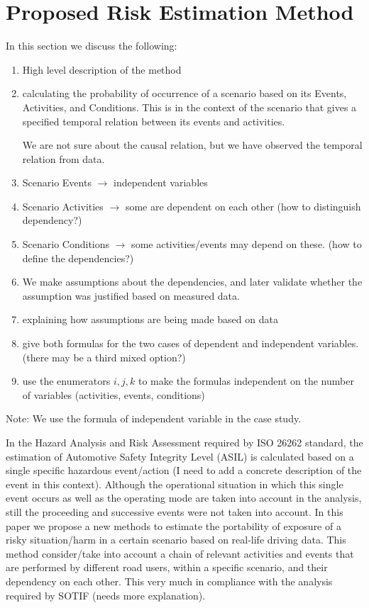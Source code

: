 \section{Proposed Risk Estimation Method} %
\label{sec:method}

In this section we discuss the following:
\begin{enumerate}
	\item High level description of the method 
	\item calculating the probability of occurrence of a scenario based on its Events, Activities, and Conditions. This is in the context of the scenario that gives a specified temporal relation between its events and activities.
	
	We are not sure about the causal relation, but we have observed the temporal relation from data. 
	 
	\item Scenario Events $\rightarrow$ independent variables 
	\item Scenario Activities $\rightarrow$ some are dependent on each other (how to distinguish dependency?)
	\item Scenario Conditions $\rightarrow$ some activities/events may depend on these. (how to define the dependencies?)
	\item We make assumptions about the dependencies, and later validate whether the assumption was justified based on measured data. 	
	\item explaining how assumptions are being made based on data
	\item give both formulas for the two cases of dependent and independent variables. (there may be a third mixed option?)
	\item use the enumerators $i, j, k$ to make the formulas independent on the number of variables (activities, events, conditions)
\end{enumerate}

Note: We use the formula of independent variable in the case study. 
 
In the Hazard Analysis and Risk Assessment required by ISO 26262 standard, the estimation of Automotive Safety Integrity Level (ASIL) is calculated based on a single specific hazardous event/action (I need to add a concrete description of the event in this context). Although the operational situation in which this single event occurs as well as the operating mode are taken into account in the analysis, still the proceeding and successive events were not taken into account.       
In this paper we propose a new methods to estimate the portability of exposure of a risky situation/harm in a certain scenario based on real-life driving data. This method consider/take into account a chain of relevant activities and events that are performed by different road users, within a specific scenario, and their dependency on each other. This very much in compliance with the analysis required by SOTIF (needs more explanation). 

